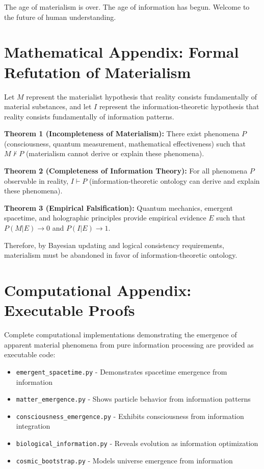 \documentclass[12pt]{article}
\begin{document}
The age of materialism is over. The age of information has begun. Welcome to the future of human understanding.

\section*{Mathematical Appendix: Formal Refutation of Materialism}

Let $M$ represent the materialist hypothesis that reality consists fundamentally of material substances, and let $I$ represent the information-theoretic hypothesis that reality consists fundamentally of information patterns.

\textbf{Theorem 1 (Incompleteness of Materialism):} There exist phenomena $P$ (consciousness, quantum measurement, mathematical effectiveness) such that $M \nvdash P$ (materialism cannot derive or explain these phenomena).

\textbf{Theorem 2 (Completeness of Information Theory):} For all phenomena $P$ observable in reality, $I \vdash P$ (information-theoretic ontology can derive and explain these phenomena).

\textbf{Theorem 3 (Empirical Falsification):} Quantum mechanics, emergent spacetime, and holographic principles provide empirical evidence $E$ such that $P(M|E) \rightarrow 0$ and $P(I|E) \rightarrow 1$.

Therefore, by Bayesian updating and logical consistency requirements, materialism must be abandoned in favor of information-theoretic ontology.

\section*{Computational Appendix: Executable Proofs}

Complete computational implementations demonstrating the emergence of apparent material phenomena from pure information processing are provided as executable code:

\begin{itemize}
\item \texttt{emergent\_spacetime.py} - Demonstrates spacetime emergence from information
\item \texttt{matter\_emergence.py} - Shows particle behavior from information patterns  
\item \texttt{consciousness\_emergence.py} - Exhibits consciousness from information integration
\item \texttt{biological\_information.py} - Reveals evolution as information optimization
\item \texttt{cosmic\_bootstrap.py} - Models universe emergence from information
\end{itemize}
\end{document}
